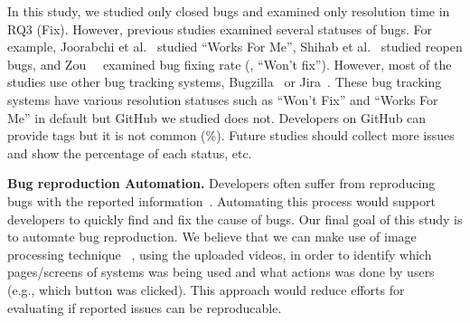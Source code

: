 In this study, we studied only closed bugs and examined only resolution time in RQ3 (Fix). However, previous studies examined several statuses of bugs. For example, Joorabchi et al.~\citep{DBLP:conf/msr/JoorabchiMM14} studied ``Works For Me'', Shihab et al.~\citep{DBLP:journals/ese/ShihabIKIOAHM13} studied reopen bugs, and Zou~\et~\citep{DBLP:conf/compsac/ZouXZCL15} examined bug fixing rate (\eg, ``Won't fix''). However, most of the studies use other bug tracking systems, Bugzilla~\citep{Bugzilla} or Jira~\citep{JIRA}. These bug tracking systems have various resolution statuses such as ``Won't Fix'' and ``Works For Me''  in default but GitHub we studied does not. Developers on GitHub can provide tags but it is not common (\%). Future studies should collect more issues and show the percentage of each status, etc. 

\noindent
\textbf{Bug reproduction Automation.}
Developers often suffer from reproducing bugs with the reported information~\citep{DBLP:conf/sigsoft/ChaparroLZMPMBN17}\citep{DBLP:conf/icsm/0001KC20}\citep{zimmermann2010TSE}.
Automating this process would support developers to quickly find and fix the cause of bugs. 
Our final goal of this study is to automate bug reproduction. 
We believe that we can make use of image processing technique ~\citep{DBLP:conf/icse/Bernal-Cardenas20}\citep{he2019arxiv}\citep{DBLP:conf/nips/KrizhevskySH12}, using the uploaded videos, in order to identify which pages/screens of systems was being used and what actions was done by users (e.g., which button was clicked). 
This approach would reduce efforts for evaluating if reported issues can be reproducable. 





